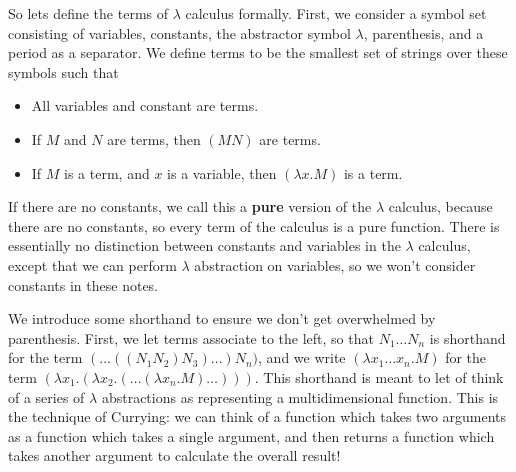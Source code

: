 So lets define the terms of $\lambda$ calculus formally. First, we consider a symbol set consisting of variables, constants, the abstractor symbol $\lambda$, parenthesis, and a period as a separator. We define terms to be the smallest set of strings over these symbols such that
%
\begin{itemize}
    \item All variables and constant are terms.
    \item If $M$ and $N$ are terms, then $(MN)$ are terms.
    \item If $M$ is a term, and $x$ is a variable, then $(\lambda x.M)$ is a term.
\end{itemize}
%
If there are no constants, we call this a {\bf pure} version of the $\lambda$ calculus, because there are no constants, so every term of the calculus is a pure function. There is essentially no distinction between constants and variables in the $\lambda$ calculus, except that we can perform $\lambda$ abstraction on variables, so we won't consider constants in these notes.

We introduce some shorthand to ensure we don't get overwhelmed by parenthesis. First, we let terms associate to the left, so that $N_1 \dots N_n$ is shorthand for the term $( \dots ((N_1 N_2) N_3) \dots ) N_n)$, and we write $(\lambda x_1 \dots x_n.M)$ for the term $(\lambda x_1.(\lambda x_2.(\dots(\lambda x_n.M)\dots)))$. This shorthand is meant to let of think of a series of $\lambda$ abstractions as representing a multidimensional function. This is the technique of Currying: we can think of a function which takes two arguments as a function which takes a single argument, and then returns a function which takes another argument to calculate the overall result!

